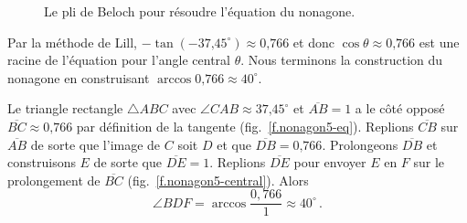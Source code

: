 \begin{figure}[htbp]
\caption{Le pli de Beloch pour résoudre l'équation du nonagone.}\label{f.nonagon3}
\end{figure}

Par la méthode de Lill, $-\tan (-\mbox{37,45}^\circ)\approx \mbox{0,766}$ et donc $\cos \theta \approx \mbox{0,766}$ est une racine de l'équation pour l'angle central $\theta$. Nous terminons la construction du nonagone en construisant $\arccos \mbox{0,766}\approx 40^\circ$.

Le triangle rectangle $\triangle ABC$ avec $\angle CAB\approx \mbox{37,45}^\circ$ et $\overline{AB}=1$ a le côté opposé $\overline{BC}\approx\mbox{0,766}$ par définition de la tangente (fig.~\ref{f.nonagon5-eq}).
Replions $\overline{CB}$ sur $\overline{AB}$ de sorte que l'image de $C$ soit $D$ et que $\overline{DB}=\mbox{0,766}$. Prolongeons $\overline{DB}$ et construisons $E$ de sorte que $\overline{DE}=1$.
Replions $\overline{DE}$ pour envoyer $E$ en $F$ sur le prolongement de $\overline{BC}$ (fig.~\ref{f.nonagon5-central}). Alors
\[
\angle BDF=\arccos \frac{0,766}{1}\approx 40^\circ\,.
\]

\vspace{0.4cm}

